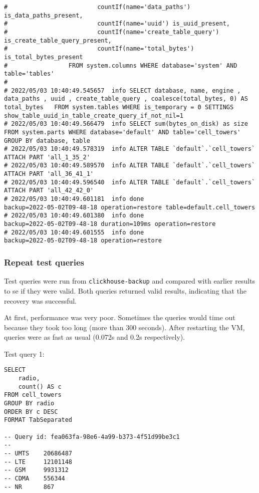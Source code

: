 \begin{verbatim}
#                         countIf(name='data_paths') is_data_paths_present,
#                         countIf(name='uuid') is_uuid_present,
#                         countIf(name='create_table_query') is_create_table_query_present,
#                         countIf(name='total_bytes') is_total_bytes_present
#                 FROM system.columns WHERE database='system' AND table='tables'
#
# 2022/05/03 10:40:49.545657  info SELECT database, name, engine , data_paths , uuid , create_table_query , coalesce(total_bytes, 0) AS total_bytes   FROM system.tables WHERE is_temporary = 0 SETTINGS show_table_uuid_in_table_create_query_if_not_nil=1
# 2022/05/03 10:40:49.566479  info SELECT sum(bytes_on_disk) as size FROM system.parts WHERE database='default' AND table='cell_towers' GROUP BY database, table
# 2022/05/03 10:40:49.578319  info ALTER TABLE `default`.`cell_towers` ATTACH PART 'all_1_35_2'
# 2022/05/03 10:40:49.589570  info ALTER TABLE `default`.`cell_towers` ATTACH PART 'all_36_41_1'
# 2022/05/03 10:40:49.596540  info ALTER TABLE `default`.`cell_towers` ATTACH PART 'all_42_42_0'
# 2022/05/03 10:40:49.601181  info done                      backup=2022-05-02T09-48-18 operation=restore table=default.cell_towers
# 2022/05/03 10:40:49.601380  info done                      backup=2022-05-02T09-48-18 duration=109ms operation=restore
# 2022/05/03 10:40:49.601555  info done                      backup=2022-05-02T09-48-18 operation=restore
\end{verbatim}

\subsubsection{Repeat test queries}
\label{sec:org4f2f2e4}
Test queries were run from \texttt{clickhouse-backup}
and compared with earlier results to se if they were valid.
Both queries returned valid results, indicating that the recovery was successful.

At first, performance was very poor.
Sometimes the queries would time out because they took too long (more than 300 seconds).
After restarting the VM, queries were as fast as usual (0.072s and 0.2s respectively).

Test query 1:
\begin{verbatim}
SELECT
    radio,
    count() AS c
FROM cell_towers
GROUP BY radio
ORDER BY c DESC
FORMAT TabSeparated

-- Query id: fea063fa-98e6-4a99-b373-4f51d99be3c1
--
-- UMTS    20686487
-- LTE     12101148
-- GSM     9931312
-- CDMA    556344
-- NR      867
\end{verbatim}

